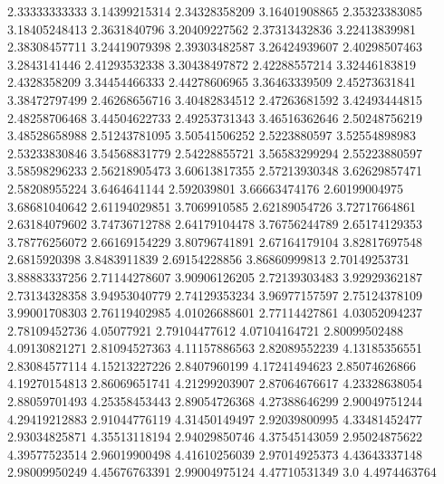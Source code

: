   2.33333333333    3.14399215314
  2.34328358209    3.16401908865
  2.35323383085    3.18405248413
   2.3631840796    3.20409227562
  2.37313432836    3.22413839981
  2.38308457711    3.24419079398
  2.39303482587    3.26424939607
  2.40298507463     3.2843141446
  2.41293532338    3.30438497872
  2.42288557214    3.32446183819
   2.4328358209    3.34454466333
  2.44278606965    3.36463339509
  2.45273631841    3.38472797499
  2.46268656716    3.40482834512
  2.47263681592    3.42493444815
  2.48258706468    3.44504622733
  2.49253731343    3.46516362646
  2.50248756219    3.48528658988
  2.51243781095    3.50541506252
   2.5223880597    3.52554898983
  2.53233830846    3.54568831779
  2.54228855721    3.56583299294
  2.55223880597    3.58598296233
  2.56218905473    3.60613817355
  2.57213930348    3.62629857471
  2.58208955224     3.6464641144
    2.592039801    3.66663474176
  2.60199004975    3.68681040642
  2.61194029851     3.7069910585
  2.62189054726    3.72717664861
  2.63184079602    3.74736712788
  2.64179104478    3.76756244789
  2.65174129353    3.78776256072
  2.66169154229    3.80796741891
  2.67164179104    3.82817697548
   2.6815920398     3.8483911839
  2.69154228856    3.86860999813
  2.70149253731    3.88883337256
  2.71144278607    3.90906126205
  2.72139303483    3.92929362187
  2.73134328358    3.94953040779
  2.74129353234    3.96977157597
  2.75124378109    3.99001708303
  2.76119402985    4.01026688601
  2.77114427861    4.03052094237
  2.78109452736       4.05077921
  2.79104477612    4.07104164721
  2.80099502488    4.09130821271
  2.81094527363    4.11157886563
  2.82089552239    4.13185356551
  2.83084577114    4.15213227226
   2.8407960199    4.17241494623
  2.85074626866    4.19270154813
  2.86069651741    4.21299203907
  2.87064676617    4.23328638054
  2.88059701493    4.25358453443
  2.89054726368    4.27388646299
  2.90049751244    4.29419212883
  2.91044776119    4.31450149497
  2.92039800995    4.33481452477
  2.93034825871    4.35513118194
  2.94029850746    4.37545143059
  2.95024875622    4.39577523514
  2.96019900498    4.41610256039
  2.97014925373    4.43643337148
  2.98009950249    4.45676763391
  2.99004975124    4.47710531349
            3.0     4.4974463764
